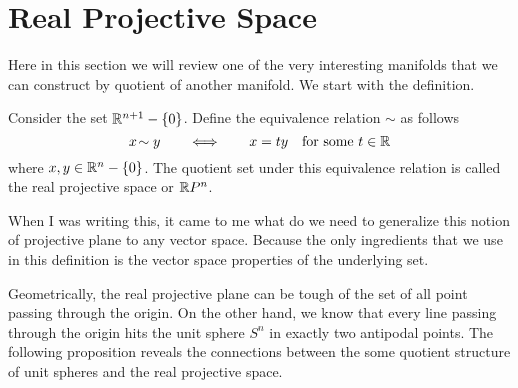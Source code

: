 \section{Real Projective Space}
Here in this section we will review one of the very interesting manifolds that we can construct by quotient of another manifold. We start with the definition.

\begin{definition}
	Consider the set $ \mathbb{R}^{n+1} - \{0\} $. Define the equivalence relation $ \sim $ as follows
	\[ x \sim y \qquad \Longleftrightarrow\qquad x = ty \quad \text{for some $ t \in \R $} \]
	where $ x,y \in \mathbb{R}^n - \{0\} $. The quotient set under this equivalence relation is called the real projective space or $ \mathbb{R} P^n $.
\end{definition}

\begin{remark}
	When I was writing this, it came to me what do we need to generalize this notion of projective plane to any vector space. Because the only ingredients that we use in this definition is the vector space properties of the underlying set. 
\end{remark}

Geometrically, the real projective plane can be tough of the set of all point passing through the origin. On the other hand, we know that every line passing through the origin hits the unit sphere $ S^n $ in exactly two antipodal points. The following proposition reveals the connections between the some quotient structure of unit spheres and the real projective space. 

